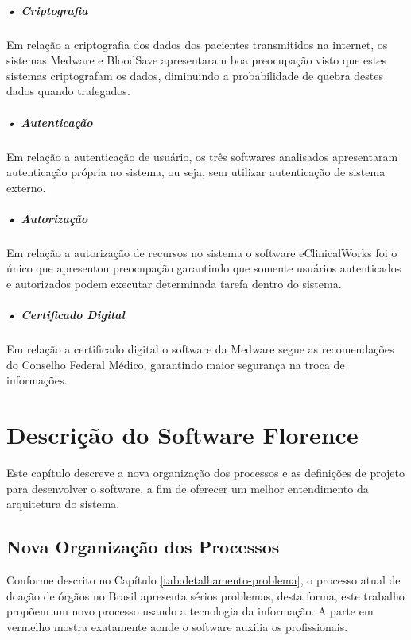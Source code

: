 \documentclass[portuguese,oneside]{tcc}
\begin{document}
\paragraph*{• Criptografia}
Em relação a criptografia dos dados dos pacientes transmitidos na internet, os sistemas Medware e BloodSave apresentaram boa preocupação visto que estes sistemas criptografam os dados, diminuindo a probabilidade de quebra destes dados quando trafegados.

\paragraph*{• Autenticação}
Em relação a autenticação de usuário, os três softwares analisados apresentaram autenticação própria no sistema, ou seja, sem utilizar autenticação de sistema externo.

\paragraph*{• Autorização}
Em relação a autorização de recursos no sistema o software eClinicalWorks foi o único que apresentou preocupação garantindo que somente usuários autenticados e autorizados podem executar determinada tarefa dentro do sistema.

\paragraph*{• Certificado Digital}
Em relação a certificado digital o software da Medware segue as recomendações do Conselho Federal Médico, garantindo maior segurança na troca de informações.

\chapter{Descrição do Software Florence} \label{tab:descricao-trabalho}
Este capítulo descreve a nova organização dos processos e as definições de projeto para desenvolver o software, a fim de oferecer um melhor entendimento da arquitetura do sistema.


\section{Nova Organização dos Processos}
Conforme descrito no Capítulo \ref{tab:detalhamento-problema}, o processo atual de doação de órgãos no Brasil apresenta sérios problemas, desta forma, este trabalho propõem um novo processo usando a tecnologia da informação. A parte em vermelho mostra exatamente aonde o software auxilia os profissionais.
\end{document}
